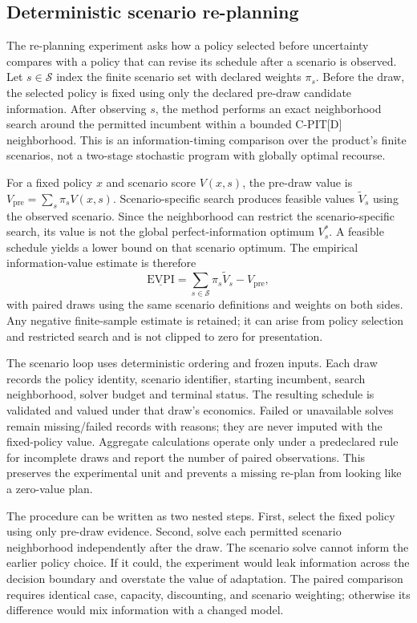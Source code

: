 \subsection{Deterministic scenario re-planning}
\label{sec:method-replanning}
The re-planning experiment asks how a policy selected before uncertainty compares with a policy that can revise its schedule after a scenario is observed. Let $s\in\mathcal S$ index the finite scenario set with declared weights $\pi_s$. Before the draw, the selected policy is fixed using only the declared pre-draw candidate information. After observing $s$, the method performs an exact neighborhood search around the permitted incumbent within a bounded C-PIT[D] neighborhood. This is an information-timing comparison over the product's finite scenarios, not a two-stage stochastic program with globally optimal recourse.

For a fixed policy $x$ and scenario score $V(x,s)$, the pre-draw value is $V_{\mathrm{pre}}=\sum_s\pi_sV(x,s)$. Scenario-specific search produces feasible values $\tilde V_s$ using the observed scenario. Since the neighborhood can restrict the scenario-specific search, its value is not the global perfect-information optimum $V_s^*$. A feasible schedule yields a lower bound on that scenario optimum. The empirical information-value estimate is therefore
\begin{equation}
 \underline{\mathrm{EVPI}}=\sum_{s\in\mathcal S}\pi_s\tilde V_s-V_{\mathrm{pre}},
\end{equation}
with paired draws using the same scenario definitions and weights on both sides. Any negative finite-sample estimate is retained; it can arise from policy selection and restricted search and is not clipped to zero for presentation.

The scenario loop uses deterministic ordering and frozen inputs. Each draw records the policy identity, scenario identifier, starting incumbent, search neighborhood, solver budget and terminal status. The resulting schedule is validated and valued under that draw's economics. Failed or unavailable solves remain missing/failed records with reasons; they are never imputed with the fixed-policy value. Aggregate calculations operate only under a predeclared rule for incomplete draws and report the number of paired observations. This preserves the experimental unit and prevents a missing re-plan from looking like a zero-value plan.

The procedure can be written as two nested steps. First, select the fixed policy using only pre-draw evidence. Second, solve each permitted scenario neighborhood independently after the draw. The scenario solve cannot inform the earlier policy choice. If it could, the experiment would leak information across the decision boundary and overstate the value of adaptation. The paired comparison requires identical case, capacity, discounting, and scenario weighting; otherwise its difference would mix information with a changed model.

